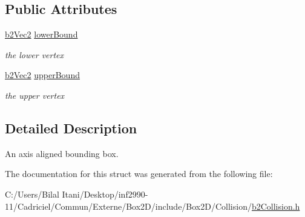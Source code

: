 \subsection*{Public Attributes}
\begin{DoxyCompactItemize}
\item 
\hyperlink{structb2_vec2}{b2\+Vec2} \hyperlink{structb2_a_a_b_b_ab94b68fbad8348b22b0522469b11bdb5}{lower\+Bound}\hypertarget{structb2_a_a_b_b_ab94b68fbad8348b22b0522469b11bdb5}{}\label{structb2_a_a_b_b_ab94b68fbad8348b22b0522469b11bdb5}

\begin{DoxyCompactList}\small\item\em the lower vertex \end{DoxyCompactList}\item 
\hyperlink{structb2_vec2}{b2\+Vec2} \hyperlink{structb2_a_a_b_b_ad4a8ec483ba13a2c02918b01d058a18f}{upper\+Bound}\hypertarget{structb2_a_a_b_b_ad4a8ec483ba13a2c02918b01d058a18f}{}\label{structb2_a_a_b_b_ad4a8ec483ba13a2c02918b01d058a18f}

\begin{DoxyCompactList}\small\item\em the upper vertex \end{DoxyCompactList}\end{DoxyCompactItemize}


\subsection{Detailed Description}
An axis aligned bounding box. 

The documentation for this struct was generated from the following file\+:\begin{DoxyCompactItemize}
\item 
C\+:/\+Users/\+Bilal Itani/\+Desktop/inf2990-\/11/\+Cadriciel/\+Commun/\+Externe/\+Box2\+D/include/\+Box2\+D/\+Collision/\hyperlink{b2_collision_8h}{b2\+Collision.\+h}\end{DoxyCompactItemize}
